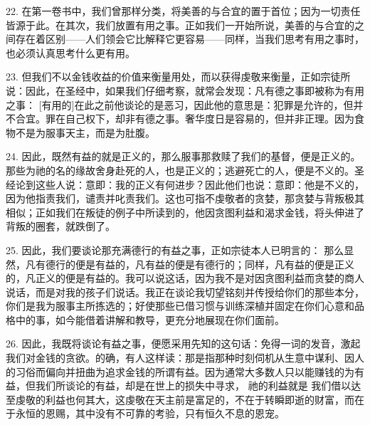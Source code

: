 \par

22. 在第一卷书中，我们曾那样分类，将美善的与合宜的置于首位；因为一切责任皆源于此。在其次，我们放置有用之事。正如我们一开始所说，美善的与合宜的之间存在着区别——人们领会它比解释它更容易——同样，当我们思考有用之事时，也必须认真思考什么更有用。\par

23. 但我们不以金钱收益的价值来衡量用处，而以获得虔敬来衡量，正如宗徒所说：因此，在圣经中，如果我们仔细考察，就常会发现：凡有德之事即被称为有用之事： [有用的]在此之前他谈论的是恶习，因此他的意思是：犯罪是允许的，但并不合宜。罪在自己权下，却非有德之事。奢华度日是容易的，但并非正理。因为食物不是为服事天主，而是为肚腹。\par

24. 因此，既然有益的就是正义的，那么服事那救赎了我们的基督，便是正义的。那些为祂的名的缘故舍身赴死的人，也是正义的；逃避死亡的人，便是不义的。圣经论到这些人说：意即：我的正义有何进步？因此他们也说：意即：他是不义的，因为他指责我们，谴责并叱责我们。这也可指不虔敬者的贪婪，那贪婪与背叛极其相似；正如我们在叛徒的例子中所读到的，他因贪图利益和渴求金钱，将头伸进了背叛的圈套，就跌倒了。\par

25. 因此，我们要谈论那充满德行的有益之事，正如宗徒本人已明言的： 那么显然，凡有德行的便是有益的，凡有益的便是有德行的；同样，凡有益的便是正义的，凡正义的便是有益的。我可以说这话，因为我不是对因贪图利益而贪婪的商人说话，而是对我的孩子们说话。我正在谈论我切望铭刻并传授给你们的那些本分，你们是我为服事主所拣选的；好使那些已借习惯与训练深植并固定在你们心意和品格中的事，如今能借着讲解和教导，更充分地展现在你们面前。\par

26. 因此，我既将谈论有益之事，便愿采用先知的这句话：免得一词的发音，激起我们对金钱的贪欲。的确，有人这样读：那是指那种时刻伺机从生意中谋利、因人的习俗而偏向并扭曲为追求金钱的所谓有益。因为通常大多数人只以能赚钱的为有益，但我们所谈论的有益，却是在世上的损失中寻求， 祂的利益就是 我们借以达至虔敬的利益也何其大，这虔敬在天主前是富足的，不在于转瞬即逝的财富，而在于永恒的恩赐，其中没有不可靠的考验，只有恒久不息的恩宠。\par

